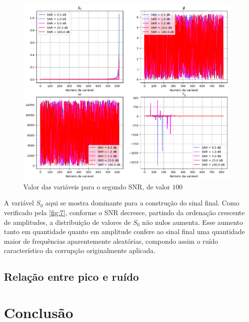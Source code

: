 \documentclass[12pt]{article}
\begin{document}
\begin{figure} [H]
    \centering
    \includegraphics[scale=0.4166]{vars-total.png}

    \caption{Valor das variáveis para o segundo SNR, de valor $100$}
    \label{fig:7}
\end{figure}

A variável $S_0$ aqui se mostra dominante para a construção do sinal final. Como verificado pela \autoref{fig:7}, conforme o SNR decresce, partindo da ordenação 
crescente de amplitudes, a distribuição de valores de $S_0$ não nulos aumenta. Esse aumento tanto em quantidade quanto em amplitude confere ao sinal final uma 
quantidade maior de frequências aparentemente aleatórias, compondo assim o ruído característico da corrupção originalmente aplicada.

\subsection{Relação entre pico e ruído}


 
\section{Conclusão}






\end{document}
